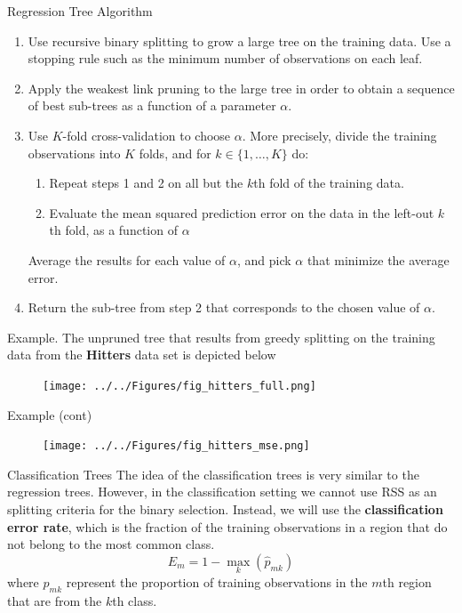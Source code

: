 \documentclass{beamer}
\begin{document}
\begin{frame}{Regression Tree Algorithm}
	\begin{enumerate}
		\item Use recursive binary splitting to grow a large tree on the training data. Use a stopping rule such as the minimum number of observations on each leaf.
		\item Apply the weakest link pruning  to the large tree in order to obtain a sequence of best sub-trees as a function of a parameter $\alpha$. 
		\item Use $K$-fold cross-validation to choose $\alpha$. More precisely, divide the training observations into $K$ folds, and for $k \in \{1,\ldots, K\}$ do:
		\begin{enumerate}
			\item Repeat steps 1 and 2 on all but the $k$th fold of the training data.
			\item Evaluate the mean squared prediction error on the data in the left-out $k$th fold, as a function of $\alpha$
		\end{enumerate} 
		Average the results for each value of $\alpha$, and pick $\alpha$ that minimize the average error.
		\item Return the sub-tree from step 2 that corresponds to the chosen value of $\alpha$.
	
	\end{enumerate}
\end{frame}

\begin{frame}{Example. }
	The unpruned tree that results from greedy splitting on the training data from the {\bf Hitters} data set is depicted below

\begin{figure}[h]
	\centering
	\texttt{[image: ../../Figures/fig\_hitters\_full.png]}
\end{figure}
\end{frame}

\begin{frame}{Example (cont)}
	\begin{figure}[h]
		\centering
		\texttt{[image: ../../Figures/fig\_hitters\_mse.png]}
	\end{figure}
\end{frame}

\begin{frame}{Classification Trees}
	The idea of the classification trees is very similar to the regression trees. However, in the classification setting we cannot use RSS as an splitting criteria for the binary selection. Instead, we will use the {\bf classification  error rate}, which is the fraction of the training observations in a region that do not belong to the most common class.
	\begin{equation*}
		E_m= 1- \max_k (\hat{p}_{mk})
	\end{equation*} 
	where $\hat{p}_{mk}$ represent the proportion of training observations in the $m$th region that are from the $k$th class. 	
	

\end{frame}
\end{document}

